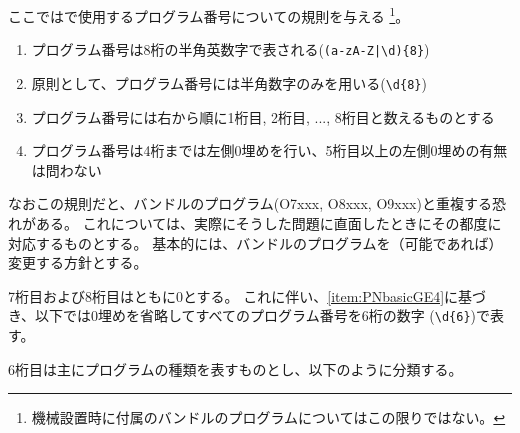 


ここでは\DMname で使用するプログラム番号についての規則を与える
\footnote{機械設置時に付属のバンドルのプログラムについてはこの限りではない。}。



\begin{enumerate}[label=\Roman*., ref=\Roman*]
\item プログラム番号は8桁の半角英数字で表される(\verb+(a-zA-Z|\d){8}+)
\item 原則として、プログラム番号には半角数字のみを用いる(\verb|\d{8}|)
\item プログラム番号には右から順に1桁目, 2桁目, ..., 8桁目と数えるものとする
\item\label{item:PNbasicGE4}プログラム番号は4桁までは左側0埋めを行い、5桁目以上の左側0埋めの有無は問わない
\end{enumerate}
\begin{hosoku}
なおこの規則だと、バンドルのプログラム(O7xxx, O8xxx, O9xxx)と重複する恐れがある。
これについては、実際にそうした問題に直面したときにその都度に対応するものとする。
基本的には、バンドルのプログラムを（可能であれば）変更する方針とする。
\end{hosoku}


7桁目および8桁目はともに0とする。
これに伴い、\ref{item:PNbasicGE4}に基づき、以下では0埋めを省略してすべてのプログラム番号を6桁の数字 (\verb|\d{6}|)で表す。


\clearpage
6桁目は主にプログラムの種類を表すものとし、以下のように分類する。

